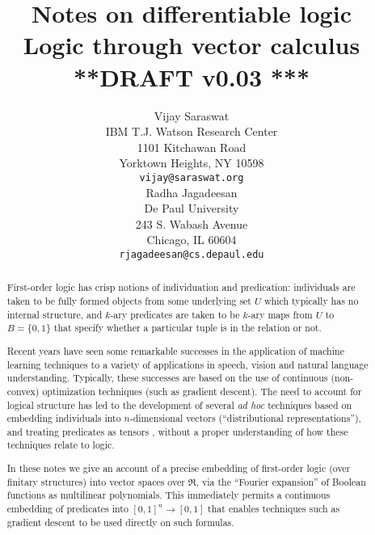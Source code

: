 \documentclass{article} %
\newcommand{\keywords}[1]{\par\addvspace\baselineskip
\noindent\keywordname\enspace\ignorespaces#1}
\begin{document}
%

\long{}
\def\mtimes{}
\def\LL#1{#1}
\title{Notes on differentiable logic \\
{\small Logic through vector calculus} \\
{\small ***DRAFT v0.03 ***}}

\author{Vijay Saraswat \\
IBM T.J. Watson Research Center\\
1101 Kitchawan Road\\
Yorktown Heights, NY 10598 \\
\texttt{vijay@saraswat.org} \\
\And
Radha Jagadeesan \\
De Paul University \\
243 S. Wabash Avenue \\
Chicago, IL 60604 \\
\texttt{rjagadeesan@cs.depaul.edu}
}

\newcommand{\fix}{\marginpar{FIX}}
\newcommand{\new}{\marginpar{NEW}}

\nipsfinalcopy %

\maketitle

\begin{abstract}
First-order logic has crisp notions of individuation and predication: individuals are taken  to be fully formed objects from some underlying set $U$ which typically has no internal structure, and $k$-ary predicates are taken to be $k$-ary maps from $U$ to $B=\{0,1\}$ that specify whether a particular tuple is in the relation or not. 

Recent years have seen some remarkable successes in the application of machine learning techniques to a variety of applications in speech, vision and natural language understanding. Typically, these successes are based on the use of continuous (non-convex) optimization techniques (such as gradient descent). The need to account for logical structure has led to the development of several {\em ad hoc} techniques based on embedding individuals into $n$-dimensional vectors (``distributional representations''), and treating predicates as tensors \cite{coecke-2010,grefenstette-2013,socher-ntn-2013,bishan-iclr15,rocktaschel-2015,order-embedding-kiros,TransIE}, without a proper understanding of how these techniques relate to logic. 

In these notes we give an account of a precise embedding of first-order logic (over finitary structures) into vector spaces over $\Re$, via the ``Fourier expansion'' of Boolean functions as multilinear polynomials. This immediately permits a continuous embedding of predicates into $[0,1]^n \rightarrow [0,1]$ that enables techniques such as gradient descent to be used directly on such formulas.

\end{abstract}
\end{document}
